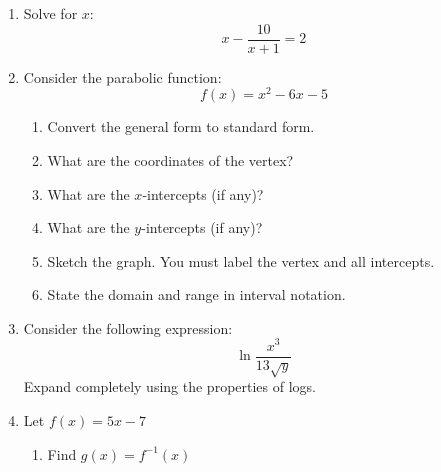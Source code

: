 \documentclass[letterpaper,12pt,fleqn]{article}
\begin{document}
\begin{enumerate}
\begin{enumerate}
    \vspace{3in}

  \end{enumerate}

  \newpage

\item Solve for $x$:
  \[x-\frac{10}{x+1}=2\]

  \vspace{2.5in}

\item Consider the parabolic function:
  \[f(x)=x^2-6x-5\]
  \begin{enumerate}
  \item Convert the general form to standard form.

    \vspace{2.5in}

  \item What are the coordinates of the vertex?

    \newpage

  \item What are the $x$-intercepts (if any)?

    \vspace{2in}

  \item What are the $y$-intercepts (if any)?

    \vspace{2in}

  \item Sketch the graph. You must label the vertex and all intercepts.

    \vspace{3in}

  \item State the domain and range in interval notation.
    
  \end{enumerate}

  \newpage

\item Consider the following expression:
  \[\ln\frac{x^3}{13\sqrt{y}}\]
  Expand completely using the properties of logs.

  \vspace{3in}

\item Let $f(x)=5x-7$
  \begin{enumerate}
  \item Find $g(x)=f^{-1}(x)$

    \vspace{2in}
    

\end{enumerate}
\end{enumerate}
\end{document}
